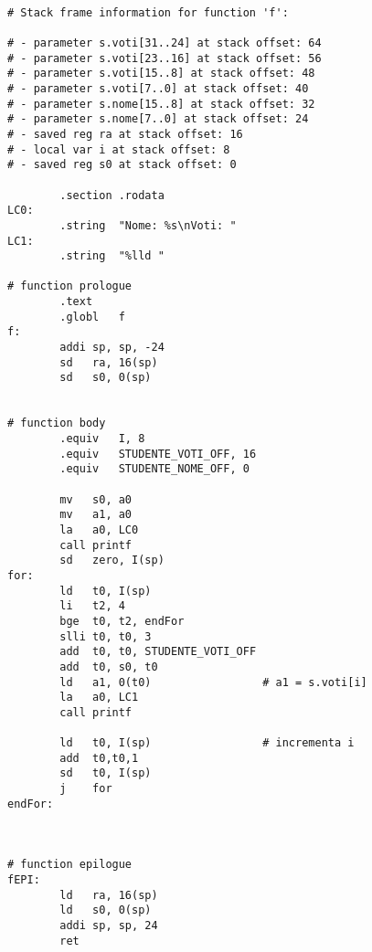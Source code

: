 
\begin{verbatim}

# Stack frame information for function 'f':

# - parameter s.voti[31..24] at stack offset: 64
# - parameter s.voti[23..16] at stack offset: 56
# - parameter s.voti[15..8] at stack offset: 48
# - parameter s.voti[7..0] at stack offset: 40
# - parameter s.nome[15..8] at stack offset: 32
# - parameter s.nome[7..0] at stack offset: 24
# - saved reg ra at stack offset: 16
# - local var i at stack offset: 8
# - saved reg s0 at stack offset: 0

        .section .rodata
LC0:
        .string  "Nome: %s\nVoti: "
LC1:
        .string  "%lld "

# function prologue
        .text
        .globl   f
f:
        addi sp, sp, -24
        sd   ra, 16(sp)
        sd   s0, 0(sp)


# function body
        .equiv   I, 8
        .equiv   STUDENTE_VOTI_OFF, 16
        .equiv   STUDENTE_NOME_OFF, 0

        mv   s0, a0
        mv   a1, a0
        la   a0, LC0
        call printf
        sd   zero, I(sp)
for:
        ld   t0, I(sp)
        li   t2, 4
        bge  t0, t2, endFor
        slli t0, t0, 3
        add  t0, t0, STUDENTE_VOTI_OFF
        add  t0, s0, t0
        ld   a1, 0(t0)                 # a1 = s.voti[i]
        la   a0, LC1
        call printf

        ld   t0, I(sp)                 # incrementa i
        add  t0,t0,1
        sd   t0, I(sp)
        j    for
endFor:



# function epilogue
fEPI:
        ld   ra, 16(sp)
        ld   s0, 0(sp)
        addi sp, sp, 24
        ret
\end{verbatim}